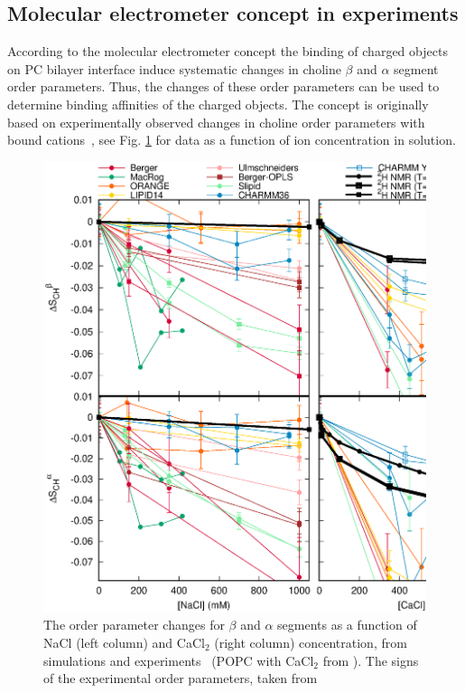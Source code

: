 \documentclass[pre,aps,floatfix,authordate1-4,twocolumn]{revtex4-1}
\begin{document}
\subsection{Molecular electrometer concept in experiments}\label{conceptinexperiments}
According to the molecular electrometer concept the binding of charged objects on 
PC bilayer interface induce systematic changes in choline $\beta$ and $\alpha$
segment order parameters. Thus, the changes of these order parameters can be used
to determine binding affinities of the charged objects. The concept is originally
based on experimentally observed changes in choline order parameters with bound 
cations~\cite{akutsu81,altenbach84}, see Fig. \ref{ordPions} for data as a function
of ion concentration in solution. 
\begin{figure}[]
  \centering
  \includegraphics[width=15cm]{../Fig/OrderParameterIONSchanges.eps}
  \caption{\label{ordPions}
    The order parameter changes for $\beta$ and $\alpha$ segments as a function of NaCl (left column) 
    and CaCl$_2$ (right column) concentration, from simulations and experiments~\cite{akutsu81} 
    (POPC with CaCl$_2$ from \cite{altenbach84}). The signs of the experimental order parameters, taken from
}
\end{figure}
\end{document}
